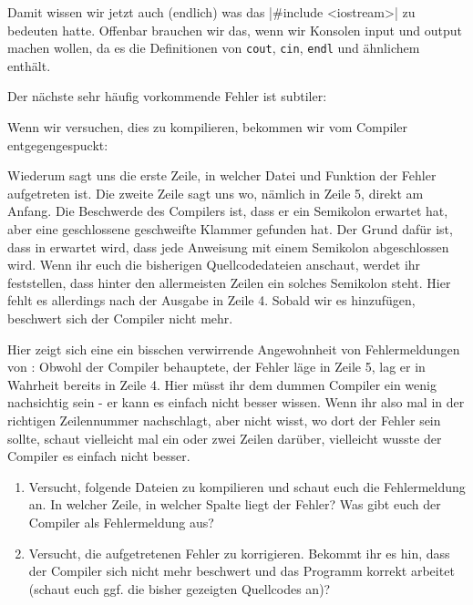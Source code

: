 Damit wissen wir jetzt auch (endlich) was das |#include <iostream>|
zu bedeuten hatte. Offenbar brauchen wir das, wenn wir Konsolen input und
output machen wollen, da es die Definitionen von \texttt{cout}, \texttt{cin},
\texttt{endl} und ähnlichem enthält.

Der nächste sehr häufig vorkommende Fehler ist subtiler:


Wenn wir versuchen, dies zu kompilieren, bekommen wir vom Compiler
entgegengespuckt:

\begin{textcode*}{label=g++ -o fehler2 fehler2.cpp}
    fehler2.cpp: In function 'int main()':
    fehler2.cpp:5:1: error: expected ';' before '}' token
\end{textcode*}

Wiederum sagt uns die erste Zeile, in welcher Datei und Funktion der Fehler
aufgetreten ist. Die zweite Zeile sagt uns wo, nämlich in Zeile 5, direkt am
Anfang. Die Beschwerde des Compilers ist, dass er ein Semikolon erwartet hat,
aber eine geschlossene geschweifte Klammer gefunden hat. Der Grund dafür ist,
dass in \Cpp erwartet wird, dass jede Anweisung mit einem Semikolon abgeschlossen
wird.  Wenn ihr euch die bisherigen Quellcodedateien anschaut, werdet ihr
feststellen, dass hinter den allermeisten Zeilen ein solches Semikolon steht.
Hier fehlt es allerdings nach der Ausgabe in Zeile 4. Sobald wir es hinzufügen,
beschwert sich der Compiler nicht mehr.

Hier zeigt sich eine ein bisschen verwirrende Angewohnheit von Fehlermeldungen
von \Cpp: Obwohl der Compiler behauptete, der Fehler läge in Zeile 5, lag er in
Wahrheit bereits in Zeile 4. Hier müsst ihr dem dummen Compiler ein wenig
nachsichtig sein - er kann es einfach nicht besser wissen. Wenn ihr also mal in
der richtigen Zeilennummer nachschlagt, aber nicht wisst, wo dort der Fehler
sein sollte, schaut vielleicht mal ein oder zwei Zeilen darüber, vielleicht
wusste der Compiler es einfach nicht besser.

\begin{praxis}
    \begin{enumerate}
        \item Versucht, folgende Dateien zu kompilieren und schaut euch die
              Fehlermeldung an. In welcher Zeile, in welcher Spalte liegt der Fehler?
              Was gibt euch der Compiler als Fehlermeldung aus?
        \item Versucht, die aufgetretenen Fehler zu korrigieren. Bekommt ihr es
              hin, dass der Compiler sich nicht mehr beschwert und das Programm
              korrekt arbeitet (schaut euch ggf. die bisher gezeigten Quellcodes an)?
    \end{enumerate}


\end{praxis}

